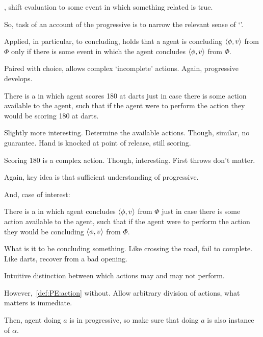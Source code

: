 \begin{note}
  , shift evaluation to some  event in which something related is true.

  So, task of an account of the progressive is to narrow the relevant sense of `'.

  Applied, in particular, to concluding,  holds that a agent is concluding \(\langle \phi, v \rangle\) from \(\Phi\) only if there is some  event in which the agent concludes \(\langle \phi, v \rangle\) from \(\Phi\).
\end{note}

\begin{note}
  Paired with choice, allows complex `incomplete' actions.
  Again, progressive develops.

  \begin{illustration}[Darts]
    There is a \pevent{} in which agent scores 180 at darts just in case there is some action available to the agent, such that if the agent were to perform the action they would be scoring 180 at darts.
  \end{illustration}

  Slightly more interesting.
  Determine the available actions.
  Though, similar, no guarantee.
  Hand is knocked at point of release, still scoring.

  Scoring 180 is a complex action.
  Though, interesting.
  First throws don't matter.

  Again, key idea is that sufficient understanding of progressive.

  And, case of interest:

  \begin{illustration}[Concluding]
    There is a \pevent{} in which agent concludes \(\langle \phi, v \rangle\) from \(\Phi\) just in case there is some action available to the agent, such that if the agent were to perform the action they would be concluding \(\langle \phi, v \rangle\) from \(\Phi\).
  \end{illustration}

  What is it to be concluding something.
  Like crossing the road, fail to complete.
  Like darts, recover from a bad opening.
\end{note}

\begin{note}
  Intuitive distinction between which actions may and may not perform.

  However,~\ref{def:PE:action} without.
  Allow arbitrary division of actions, what matters is immediate.

  Then, agent doing \(a\) is in progressive, so make sure that doing \(a\) is also instance of \(\alpha\).
\end{note}


